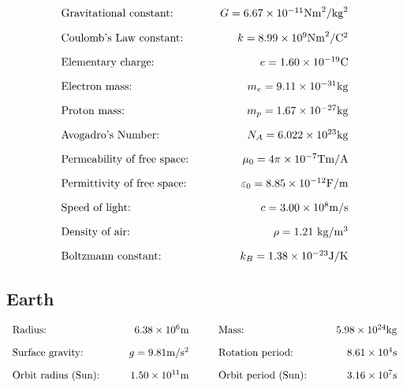 \documentclass[12pt,a4paper]{article}
\begin{document}
\begin{align*}
  \begin{array}{l@{\hspace{1cm}}r}
    \text{Gravitational constant:} & G=6.67 \times 10^{-11} \mathrm{Nm}^2/\mathrm{kg}^2 \\[1em]
    \text{Coulomb's Law constant:} & k=8.99 \times 10^9 \mathrm{Nm}^2/\mathrm{C}^2 \\[1em]
    \text{Elementary charge:} & e=1.60 \times 10^{-19} \mathrm{C} \\[1em]
    \text{Electron mass:} & m_e=9.11 \times 10^{-31} \mathrm{kg} \\[1em]
    \text{Proton mass:} & m_p=1.67 \times 10^{-27} \mathrm{kg} \\[1em]
    \text{Avogadro's Number:} & N_A=6.022 \times 10^{23} \mathrm{kg} \\[1em]
    \text{Permeability of free space:} & \mu_0=4\pi \times 10^{-7} \mathrm{Tm}/\mathrm{A} \\[1em]
    \text{Permittivity of free space:} & \varepsilon_0 = 8.85 \times 10^{-12} \mathrm{F}/\mathrm{m} \\[1em]
    \text{Speed of light:} & c=3.00 \times 10^8 \mathrm{m}/\mathrm{s} \\[1em]
    \text{Density of air:} & \rho=1.21 \mathrm{~kg} / \mathrm{m}^3 \\[1em]
    \text{Boltzmann constant:} & k_B=1.38 \times 10^{-23} \mathrm{J}/\mathrm{K}
  \end{array}
\end{align*}

\subsection{Earth}
\begin{align*}
  \begin{array}{l@{\hspace{1cm}}r@{\hspace{1cm}}l@{\hspace{1cm}}r}
    \text{Radius:} & 6.38 \times 10^6 \mathrm{m} & \text{Mass:} & 5.98 \times 10^{24} \mathrm{kg} \\[1em]
    \text{Surface gravity:} & g=9.81 \mathrm{m}/\mathrm{s}^2 & \text{Rotation period:} & 8.61 \times 10^4 \mathrm{s} \\[1em]
    \text{Orbit radius (Sun):} & 1.50 \times 10^{11} \mathrm{m} & \text{Orbit period (Sun):} & 3.16 \times 10^7 \mathrm{s}
  \end{array}
\end{align*}
\end{document}
